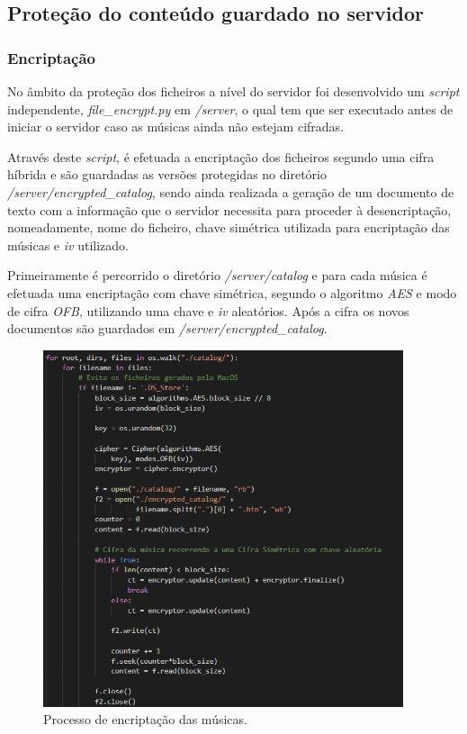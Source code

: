 \documentclass[10pt,english]{article}
\begin{document}
\subsection{Proteção do conteúdo guardado no servidor}
\subsubsection{Encriptação}
\par No âmbito da proteção dos ficheiros a nível do servidor foi desenvolvido um \textit{script} independente, \textit{file\_encrypt.py} em \textit{/server}, o qual tem que ser executado antes de iniciar o servidor caso as músicas ainda não estejam cifradas.

\par Através deste \textit{script}, é efetuada a encriptação dos ficheiros segundo uma cifra híbrida e são guardadas as versões protegidas no diretório \textit{/server/encrypted\_catalog}, sendo ainda realizada a geração de um documento de texto com a informação que o servidor necessita para proceder à desencriptação, nomeadamente, nome do ficheiro, chave simétrica utilizada para encriptação das músicas e \textit{iv} utilizado.

\par Primeiramente é percorrido o diretório \textit{/server/catalog} e para cada música é efetuada uma encriptação com chave simétrica, segundo o algoritmo \textit{AES} e modo de cifra \textit{OFB}, utilizando uma chave e \textit{iv} aleatórios. Após a cifra os novos documentos são guardados em \textit{/server/encrypted\_catalog}.

\begin{figure}[!h]
        \centering
        \includegraphics[width=400]{images/Encriptação das músicas.png}
        \caption{Processo de encriptação das músicas.}
\end{figure}
\end{document}
